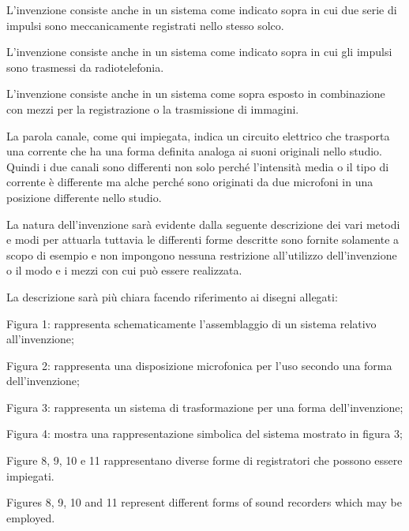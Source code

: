 \documentclass[11pt]{article}
\begin{document}
\begin{multicols*}{2}
L’invenzione consiste anche in un sistema come indicato sopra in cui due serie di impulsi sono meccanicamente registrati nello stesso solco.

L’invenzione consiste anche in un sistema come indicato sopra in cui gli impulsi sono trasmessi da radiotelefonia.

L’invenzione consiste anche in un sistema come sopra esposto in combinazione con mezzi per la registrazione o la trasmissione di immagini.

La parola canale, come qui impiegata, indica un circuito elettrico che trasporta una corrente che ha una forma definita analoga ai suoni originali nello studio. Quindi i due canali sono differenti non solo perché l’intensità media o il tipo di corrente è differente ma alche perché sono originati da due microfoni in una posizione differente nello studio.

La natura dell’invenzione sarà evidente dalla seguente descrizione dei vari metodi e modi per attuarla tuttavia le differenti forme descritte sono fornite solamente a scopo di esempio e non impongono nessuna restrizione all’utilizzo dell’invenzione o il modo e i mezzi con cui può essere realizzata.

La descrizione sarà più chiara facendo riferimento ai disegni allegati:

Figura 1: rappresenta schematicamente l’assemblaggio di un sistema relativo all’invenzione;

Figura 2: rappresenta una disposizione microfonica per l’uso secondo una forma dell’invenzione;

Figura 3: rappresenta un sistema di trasformazione per una forma dell’invenzione; 

Figura 4: mostra una rappresentazione simbolica del sistema mostrato in figura 3;

Figure 8, 9, 10 e 11 rappresentano diverse forme di registratori che possono essere impiegati.

Figures 8, 9, 10 and 11 represent different forms of sound recorders which may be employed.


\end{multicols*}
\end{document}
